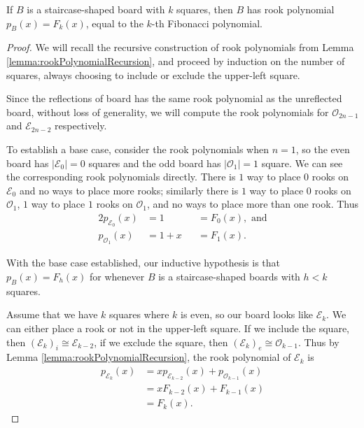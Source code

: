 \begin{lemma}
  If $B$ is a staircase-shaped board with $k$ squares, then
  $B$ has rook polynomial $p_{B}(x) = F_{k}(x)$, equal to the $k$-th
  Fibonacci polynomial.
  \label{lemma:staircaseIsFibonacci}
\end{lemma}
\begin{proof}
  We will recall the recursive construction of rook polynomials from
  Lemma \ref{lemma:rookPolynomialRecursion}, and proceed by
  induction on the number of squares, always choosing to include or exclude
  the upper-left square.

  Since the reflections of board has the same rook polynomial as the
  unreflected board, without loss of generality, we
  will compute the rook polynomials for
  $\mathcal{O}_{2n-1}$ and $\mathcal{E}_{2n-2}$ respectively.

  To establish a base case, consider the rook polynomials when $n = 1$, so
  the even board has $|\mathcal{E}_{0}| = 0$ squares and
  the odd board has $|\mathcal{O}_{1}| = 1$ square.
  We can see the corresponding rook polynomials directly. There is $1$ way to
  place $0$ rooks on $\mathcal{E}_{0}$ and no ways to place more rooks;
  similarly there is
  $1$ way to place $0$ rooks on $\mathcal{O}_{1}$,
  $1$ way to place $1$ rooks on $\mathcal{O}_{1}$, and
  no ways to place more than one rook. Thus \begin{alignat}{2}
    p_{\mathcal{E}_{0}}(x) &= 1     &&= F_0(x), \text{ and} \\
    p_{\mathcal{O}_{1}}(x) &= 1 + x &&= F_1(x).
  \end{alignat}

  With the base case established, our inductive hypothesis is that
  $p_{B}(x) = F_{h}(x)$ for
  whenever $B$ is a
  staircase-shaped boards with $h < k$ squares.

  Assume that we have $k$ squares where $k$ is even, so our board looks like
  $\mathcal{E}_{k}$. We can either place a rook or not in the upper-left square.
  If we include the square, then $(\mathcal{E}_{k})_i \cong \mathcal{E}_{k-2}$,
  if we exclude the square, then $(\mathcal{E}_{k})_e \cong \mathcal{O}_{k-1}$.
  Thus by Lemma \ref{lemma:rookPolynomialRecursion}, the rook polynomial of
  $\mathcal{E}_{k}$ is
  \begin{align}
    p_{\mathcal{E}_{k}}(x)
    &= xp_{\mathcal{E}_{k-2}}(x) + p_{\mathcal{O}_{k-1}}(x) \\
    &= xF_{k-2}(x) + F_{k-1}(x) \\
    &= F_{k}(x).
  \end{align}


\end{proof}
